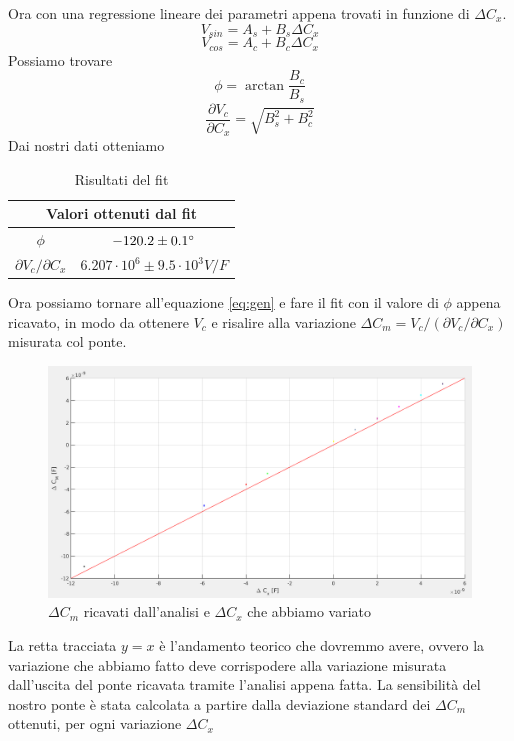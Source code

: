 \documentclass[12pt,]{article}
\begin{document}
Ora con una regressione lineare dei parametri appena trovati in funzione di $ \Delta C_x$.
$$V_{sin}= A_s + B_s \Delta{C_x}$$
$$V_{cos} = A_c + B_c \Delta{C_x}$$
Possiamo trovare 
\begin{equation}
\phi = \arctan{\frac{B_c}{B_s}}
\end{equation}
\begin{equation}
\frac{\partial{V_{c}}}{\partial{C_x}} = \sqrt{B_s^2 + B_c^2}
\end{equation}
Dai nostri dati otteniamo
\begin{table}[H]
\centering
\begin{tabular}{c|c}
\toprule
\multicolumn{2}{c}{Valori ottenuti dal fit}\\
\midrule
\rowcolor{black!20}$\phi$ & $-120.2 \pm 0.1 \degree$ \\
$\partial V_{c}/\partial C_x $ & $ 6.207\cdot 10^{6}\pm 9.5\cdot 10^{3} V/F $ \\
\bottomrule
\end{tabular}
\caption{Risultati del fit}
\end{table}
Ora possiamo tornare all'equazione \eqref{eq:gen} e fare il fit con il valore di $\phi$ appena ricavato, in modo da ottenere $V_c$ e risalire alla variazione $\Delta C_m = V_c/(\partial V_{c}/\partial{C_x})$ misurata col ponte.
\begin{figure}[H]
\centering
\includegraphics[width=\textwidth]{deltacm}
\caption{$\Delta C_m$ ricavati dall'analisi e $\Delta C_x$ che abbiamo variato}
\end{figure}
La retta tracciata $y=x$ è l'andamento teorico che dovremmo avere, ovvero la variazione che abbiamo fatto deve corrispodere alla variazione misurata dall'uscita del ponte ricavata tramite l'analisi appena fatta. La sensibilità del nostro ponte è stata calcolata a partire dalla deviazione standard dei $\Delta C_m$ ottenuti, per ogni variazione $\Delta C_x$
\end{document}
